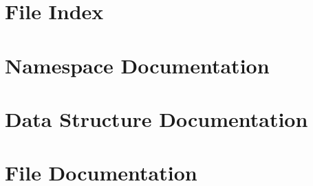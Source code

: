 \let\mypdfximage\pdfximage\def\pdfximage{\immediate\mypdfximage}\documentclass[twoside]{book}
\newcommand{\+}{\discretionary{\mbox{\scriptsize$\hookleftarrow$}}{}{}}
\newcommand{\clearemptydoublepage}{%
  \newpage{\pagestyle{empty}\cleardoublepage}%
}
\begin{document}
\chapter{File Index}

\chapter{Namespace Documentation}






\chapter{Data Structure Documentation}




















\chapter{File Documentation}

















































\backmatter
\newpage
{}
\clearemptydoublepage
{}
\printindex
\end{document}
